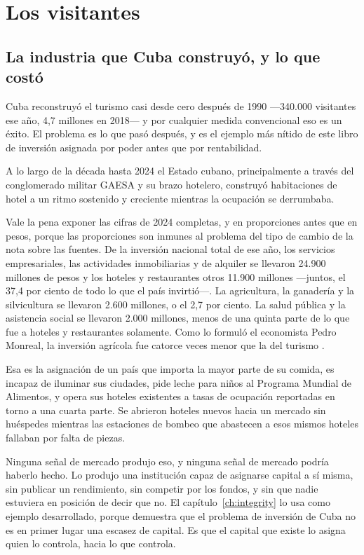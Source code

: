 \chapter{Los visitantes}
\label{ch:tourism}

\section{La industria que Cuba construyó, y lo que costó}

Cuba reconstruyó el turismo casi desde cero después de 1990 ---340.000 visitantes ese
año, 4,7 millones en 2018--- y por cualquier medida convencional eso es un éxito. El
problema es lo que pasó después, y es el ejemplo más nítido de este libro de inversión
asignada por poder antes que por rentabilidad.

A lo largo de la década hasta 2024 el Estado cubano, principalmente a través del
conglomerado militar GAESA y su brazo hotelero, construyó habitaciones de hotel a un
ritmo sostenido y creciente mientras la ocupación se derrumbaba.

Vale la pena exponer las cifras de 2024 completas, y en proporciones antes que en pesos,
porque las proporciones son inmunes al problema del tipo de cambio de la nota sobre las
fuentes. De la inversión nacional total de ese año, los servicios empresariales, las
actividades inmobiliarias y de alquiler se llevaron 24.900 millones de pesos y los hoteles
y restaurantes otros 11.900 millones ---juntos, el 37,4 por ciento de todo lo que el país
invirtió---. La agricultura, la ganadería y la silvicultura se llevaron 2.600 millones, o
el 2,7 por ciento. La salud pública y la asistencia social se llevaron 2.000 millones,
menos de una quinta parte de lo que fue a hoteles y restaurantes solamente. Como lo
formuló el economista Pedro Monreal, la inversión agrícola fue catorce veces menor que la
del turismo \citep{oneiinv}.\unv{}

Esa es la asignación de un país que importa la mayor parte de su comida, es incapaz de
iluminar sus ciudades, pide leche para niños al Programa Mundial de Alimentos, y opera sus
hoteles existentes a tasas de ocupación reportadas en torno a una cuarta parte. Se
abrieron hoteles nuevos hacia un mercado sin huéspedes mientras las estaciones de bombeo
que abastecen a esos mismos hoteles fallaban por falta de piezas.

Ninguna señal de mercado produjo eso, y ninguna señal de mercado podría haberlo hecho. Lo
produjo una institución capaz de asignarse capital a sí misma, sin publicar un
rendimiento, sin competir por los fondos, y sin que nadie estuviera en posición de decir
que no. El capítulo~\ref{ch:integrity} lo usa como ejemplo desarrollado, porque demuestra
que el problema de inversión de Cuba no es en primer lugar una escasez de capital. Es que
el capital que existe lo asigna quien lo controla, hacia lo que controla.

